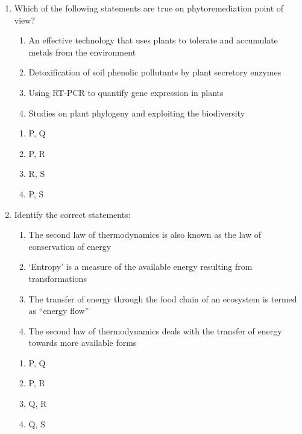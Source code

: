 \documentclass[journal,12pt,onecolumn]{IEEEtran}
\begin{document}
\begin{enumerate}
\begin{multicols}{2}
\begin{enumerate}[label=(\Alph*)]
    \item Cyt$_a$ and Cyt$_b$
    \item Cyt$_a$ and Cyt$_c$
    \item Cyt$_b$ and Cyt$_c$
    \item Cyt$_b$ and Cyt$_{b_1}$ 
\end{enumerate}
\end{multicols}
\item Which of the following statements are true on phytoremediation point of view?  
\begin{enumerate}[label=\Alph*:,start=16]
\item An effective technology that uses plants to tolerate and accumulate metals from the environment
\item Detoxification of soil phenolic pollutants by plant secretory enzymes
\item Using RT-PCR to quantify gene expression in plants
\item Studies on plant phylogeny and exploiting the biodiversity
\end{enumerate}

\begin{multicols}{2}
\begin{enumerate}[label=(\Alph*)]
\item P, Q
\item P, R
\item R, S
\item P, S
\end{enumerate}
\end{multicols}

\item Identify the correct statements:  
\begin{enumerate}[label=\Alph*:,start=16]
\item The second law of thermodynamics is also known as the law of conservation of energy
\item ‘Entropy’ is a measure of the available energy resulting from transformations
\item The transfer of energy through the food chain of an ecosystem is termed as “energy flow”
\item The second law of thermodynamics deals with the transfer of energy towards more available forms
\end{enumerate}

\begin{multicols}{2}
\begin{enumerate}[label=(\Alph*)]
\item P, Q
\item P, R
\item Q, R
\item Q, S
\end{enumerate}
\end{multicols}


\end{enumerate}
\end{document}
